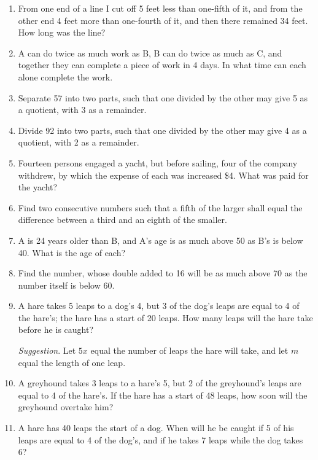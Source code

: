 \documentclass{book}
\begin{document}
\begin{enumerate}
\item From one end of a line I cut off 5 feet less than one-fifth
of it, and from the other end 4 feet more than one-fourth of it,
and then there remained 34 feet. How long was the line?

\item A can do twice as much work as B, B can do twice
as much as C, and together they can complete a piece of
work in 4 days. In what time can each alone complete the
work.

\item Separate 57 into two parts, such that one divided by
the other may give 5 as a quotient, with 3 as a remainder.

\item Divide 92 into two parts, such that one divided by
the other may give 4 as a quotient, with 2 as a remainder.

\item Fourteen persons engaged a yacht, but before sailing,
four of the company withdrew, by which the expense
of each was increased \$4. What was paid for the yacht?

\item Find two consecutive numbers such that a fifth of
the larger shall equal the difference between a third and an
eighth of the smaller.

\item A is 24 years older than B, and A's age is as much
above 50 as B's is below 40. What is the age of each?

\item Find the number, whose double added to 16 will
be as much above 70 as the number itself is below 60.

\item A hare takes 5 leaps to a dog's 4, but 3 of the dog's
leaps are equal to 4 of the hare's; the hare has a start of
20 leaps. How many leaps will the hare take before he is
caught?

\textit{ Suggestion}. Let $5x$ equal the number of leaps the hare
will take, and let $m$ equal the length of one leap.

\item A greyhound takes 3 leaps to a hare's 5, but 2 of
the greyhound's leaps are equal to 4 of the hare's. If the
hare has a start of 48 leaps, how soon will the greyhound
overtake him?

\item A hare has 40 leaps the start of a dog. When will
he be caught if 5 of his leaps are equal to 4 of the dog's,
and if he takes 7 leaps while the dog takes 6?
\end{enumerate}
\end{document}

